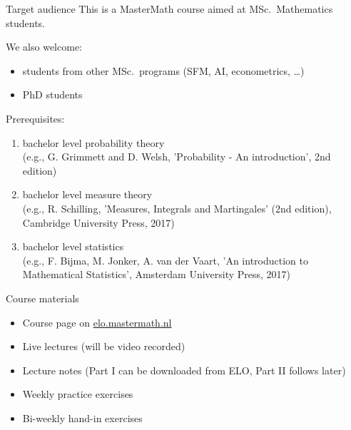 \begin{frame}{Target audience}
  This is a MasterMath course aimed at MSc.\ Mathematics students.

  \bigskip
  We also welcome:
  \begin{itemize}
    \item students from other MSc.\ programs (SFM, AI, econometrics, \dots)
    \item PhD students
  \end{itemize}
  
  \bigskip
  Prerequisites:
  \begin{enumerate}
    \item bachelor level probability theory\\
      {\tiny(e.g., G. Grimmett and D. Welsh, 'Probability - An introduction', 2nd edition)}
\item bachelor level measure theory\\
  {\tiny(e.g., R. Schilling, 'Measures, Integrals and Martingales' (2nd edition), Cambridge University Press, 2017)}
\item bachelor level statistics\\
  {\tiny(e.g., F. Bijma, M. Jonker, A. van der Vaart, 'An introduction to Mathematical Statistics', Amsterdam University Press, 2017)}
  \end{enumerate}
\end{frame}

\begin{frame}{Course materials}
  \begin{itemize}
    \item Course page on \url{elo.mastermath.nl} 
    \item Live lectures (will be video recorded)
    \item Lecture notes (Part I can be downloaded from ELO, Part II follows later)
    \item Weekly practice exercises
    \item Bi-weekly hand-in exercises
  \end{itemize}
\end{frame}

